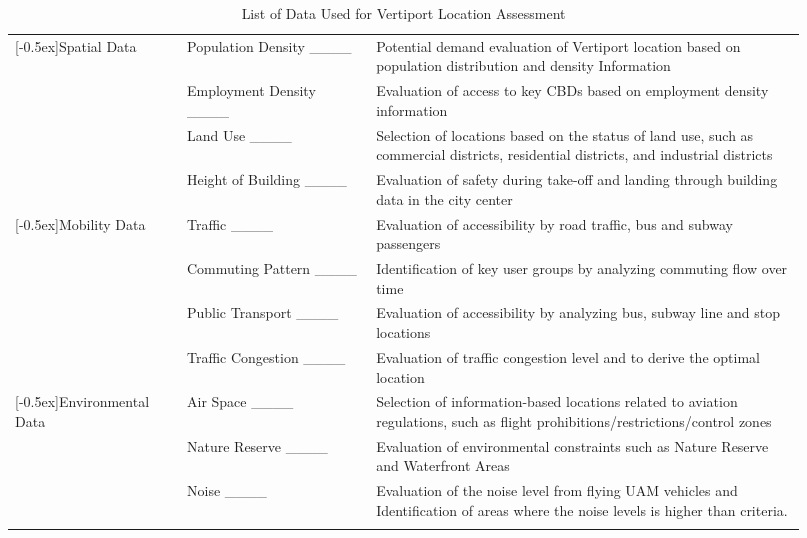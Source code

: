 \begin{table}[H]
    \caption{List of Data Used for Vertiport Location Assessment}\label{tab:Major Data}
        \begin{center}
        \begin{tabular}{>{\raggedright\arraybackslash}m{0.2\linewidth}>{\raggedright\arraybackslash}m{0.22\linewidth}>{\raggedright\arraybackslash}m{0.5\linewidth}} \toprule[1.5pt]
            \multicolumn{1}{c}{\textbf{Category}} & \multicolumn{1}{c}{\textbf{Data}} & \multicolumn{1}{c}{\textbf{Application}} \\ 
            \midrule[1.5pt]
            \multirow{4}{*}[-0.5ex]{Spatial Data} & Population Density ____ & Potential demand evaluation of Vertiport location based on population distribution and density Information \\ \cline{2-3}
             & Employment Density ____ & Evaluation of access to key CBDs based on employment density information \\ \cline{2-3}
             & Land Use ____ & Selection of locations based on the status of land use, such as commercial districts, residential districts, and industrial districts \\ \cline{2-3}
             & Height of Building ____ & Evaluation of safety during take-off and landing through building data in the city center \\ \hline
            \multirow{4}{*}[-0.5ex]{Mobility Data} & Traffic ____ & Evaluation of accessibility by road traffic, bus and subway passengers \\ \cline{2-3}
             & Commuting Pattern ____ & Identification of key user groups by analyzing commuting flow over time \\ \cline{2-3}
             & Public Transport ____& Evaluation of accessibility by analyzing bus, subway line and stop locations \\ \cline{2-3}
             & Traffic Congestion ____ & Evaluation of traffic congestion level and to derive the optimal location \\ \hline
            \multirow{4}{*}[-0.5ex]{Environmental Data} & Air Space ____ & Selection of information-based locations related to aviation regulations, such as flight prohibitions/restrictions/control zones \\ \cline{2-3}
             & Nature Reserve ____ & Evaluation of environmental constraints such as Nature Reserve and Waterfront Areas \\ \cline{2-3}
             & Noise ____ & Evaluation of the noise level from flying UAM vehicles and Identification of areas where the noise levels is higher than criteria. \\ \cline{2-3}

\end{tabular}
\end{center}
\end{table}
